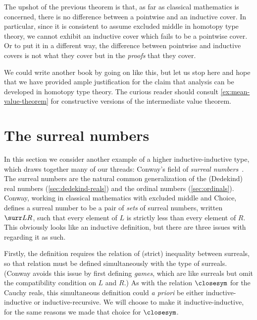 The upshot of the previous theorem is that, as far as classical mathematics is concerned,
there is no difference between a pointwise and an inductive cover. In particular, since it
is consistent to assume excluded middle in homotopy type theory, we cannot exhibit an
inductive cover which fails to be a pointwise cover. Or to put it in a different way, the
difference between pointwise and inductive covers is not what they cover but in the
\emph{proofs} that they cover.

We could write another book by going on like this, but let us stop here and hope that we
have provided ample justification for the claim that analysis can be developed in homotopy
type theory. The curious reader should consult \cref{ex:mean-value-theorem} for
constructive versions of the intermediate value theorem.


%
%

\section{The surreal numbers}
\label{sec:surreals}

%

In this section we consider another example of a higher inductive-in\-duc\-tive type, which draws together many of our threads: Conway's field \NO of \emph{surreal numbers}~\cite{conway:onag}.
The surreal numbers are the natural common generalization of the (Dedekind) real numbers (\cref{sec:dedekind-reals}) and the ordinal numbers (\cref{sec:ordinals}).
Conway, working in classical mathematics with excluded middle and Choice, defines a surreal number to be a pair of \emph{sets} of surreal numbers, written $\surr L R$, such that every element of $L$ is strictly less than every element of $R$.
This obviously looks like an inductive definition, but there are three issues with regarding it as such.

Firstly, the definition requires the relation of (strict) inequality between surreals, so that relation must be defined simultaneously with the type \NO of surreals.
(Conway avoids this issue by first defining \emph{games}, which are like surreals but omit the compatibility condition on $L$ and $R$.)
As with the relation $\closesym$ for the Cauchy reals, this simultaneous definition could \emph{a priori} be either inductive-inductive or inductive-recursive.
We will choose to make it inductive-inductive, for the same reasons we made that choice for $\closesym$.

